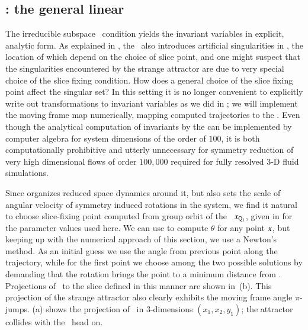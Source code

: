\documentclass[preprint,number,sort&compress]{elsarticle}
\begin{document}
\subsection{\label{s:mfReqb}\CLe: the general linear \slice}

The irreducible subspace \slice\ condition
 yields the in\-vari\-ant variables
 in explicit, analytic form. As explained
in , the \mframes\ also introduces
artificial singularities in \reducedsp, the location of which
depend on the choice of slice point, and one might suspect that
the singularities encountered by the strange attractor are
due to very special choice of the slice fixing condition. How
does a general choice of the slice fixing point affect the singular
set? In this setting it is no longer convenient to explicitly write
out transformations to in\-vari\-ant variables as we did in
; we will implement the moving frame map
numerically, mapping computed trajectories to the \slice.
Even though the analytical computation of
in\-vari\-ants by the {\mframes} can be implemented by computer
algebra for system dimensions of the order
of $100$, it is both computationally prohibitive and utterly
unnecessary for symmetry reduction of very high dimensional
flows of order $100,000$ required for fully resolved $3$-D
fluid simulations.

Since  organizes reduced space dynamics around it,
but also sets the scale of angular velocity of symmetry
induced rotations in the system, we find it natural to choose
slice-fixing point  computed from
group orbit of the \reqv\ $x_{\mathrm{Q}_{1}}$, given in  for
the parameter values used here.
We can use
 to compute $\theta$ for any point $x$, but
keeping up with the numerical approach of this section, we
use a Newton's method. As an initial guess we use the angle
from previous point along the trajectory, while for the first
point we choose among the two possible solutions by demanding
that the rotation brings the point to a minimum distance from
\slicep. Projections of \cLf\ to the slice defined in this
manner are shown in \,(b). This projection
of the strange attractor also
clearly exhibits the moving frame angle $\pi$-jumps.
(a) shows the projection of \sset\ in
$3$-dimensions $(x_1,x_2,y_1)$; the attractor
collides with the \sset\ head on.
\end{document}
